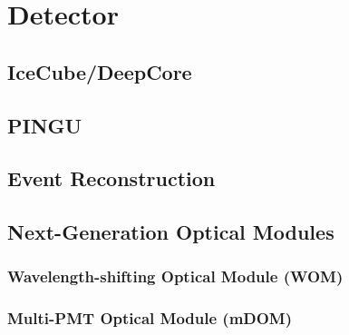 \chapter{Detector}
\label{sec:det}


\section{IceCube/DeepCore}
\label{sec:ICDC}


\section{PINGU}
\label{sec:PINGU}


\section{Event Reconstruction}
\label{sec:EvtReco}


\section{Next-Generation Optical Modules}
\label{sec:EvtReco}

\subsection{Wavelength-shifting Optical Module (WOM)}


\subsection{Multi-PMT Optical Module (mDOM)}